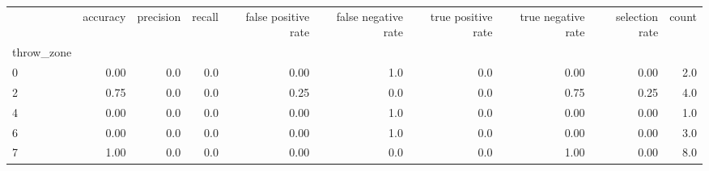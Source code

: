 \begin{tabular}{lrrrrrrrrr}
\toprule
{} &  accuracy &  precision &  recall &  false positive rate &  false negative rate &  true positive rate &  true negative rate &  selection rate &  count \\
throw\_zone &           &            &         &                      &                      &                     &                     &                 &        \\
\midrule
0          &      0.00 &        0.0 &     0.0 &                 0.00 &                  1.0 &                 0.0 &                0.00 &            0.00 &    2.0 \\
2          &      0.75 &        0.0 &     0.0 &                 0.25 &                  0.0 &                 0.0 &                0.75 &            0.25 &    4.0 \\
4          &      0.00 &        0.0 &     0.0 &                 0.00 &                  1.0 &                 0.0 &                0.00 &            0.00 &    1.0 \\
6          &      0.00 &        0.0 &     0.0 &                 0.00 &                  1.0 &                 0.0 &                0.00 &            0.00 &    3.0 \\
7          &      1.00 &        0.0 &     0.0 &                 0.00 &                  0.0 &                 0.0 &                1.00 &            0.00 &    8.0 \\
\bottomrule
\end{tabular}

